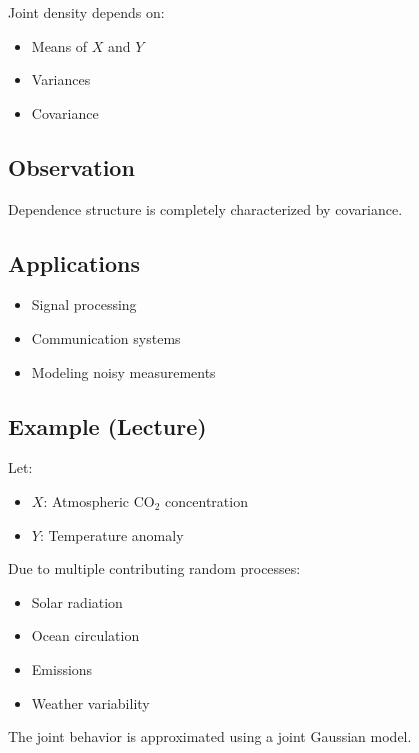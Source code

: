 \documentclass[12pt]{article}
\begin{document}
Joint density depends on:
\begin{itemize}
    \item Means of $X$ and $Y$
    \item Variances
    \item Covariance
\end{itemize}

\subsection{Observation}

Dependence structure is completely characterized by covariance.

\subsection{Applications}

\begin{itemize}
    \item Signal processing
    \item Communication systems
    \item Modeling noisy measurements
\end{itemize}

\subsection{Example (Lecture)}

Let:
\begin{itemize}
    \item $X$: Atmospheric CO$_2$ concentration
    \item $Y$: Temperature anomaly
\end{itemize}

Due to multiple contributing random processes:
\begin{itemize}
    \item Solar radiation
    \item Ocean circulation
    \item Emissions
    \item Weather variability
\end{itemize}

The joint behavior is approximated using a joint Gaussian model.
\end{document}

